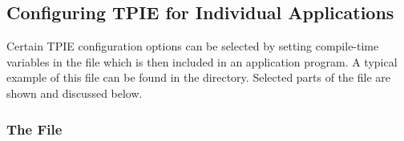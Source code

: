 \subsection{Configuring TPIE for Individual Applications}

Certain TPIE configuration options can be selected by
setting compile-time variables in the file
which is then included in an application program. A typical
example of this file can be found in the 
directory. Selected parts of the file are shown
and discussed below. 

\subsubsection{The File }


